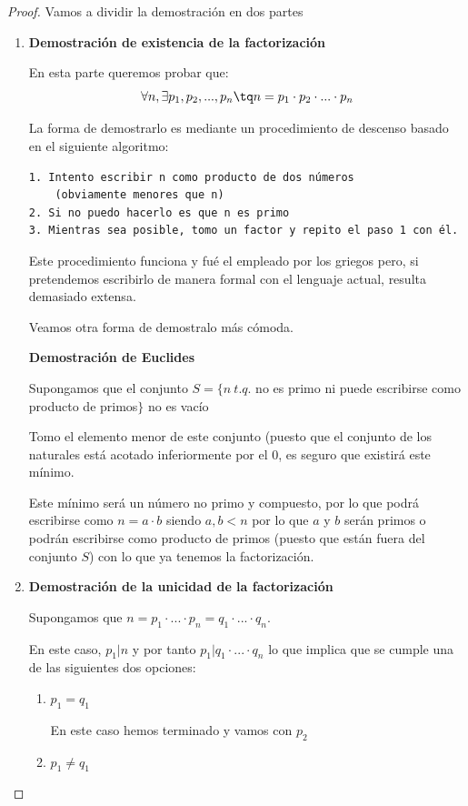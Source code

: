 \documentclass{apuntes}
\begin{document}
\begin{proof}
Vamos a dividir la demostración en dos partes

\begin{enumerate}
\item \textbf{Demostración de existencia de la factorización}

En esta parte queremos probar que:
\[\forall n , \exists p_1,p_2,...,p_n \tq n=p_1\cdot p_2 \cdot ... \cdot p_n\]

La forma de demostrarlo es mediante un procedimiento de descenso basado en el siguiente algoritmo:
\begin{verbatim}
1. Intento escribir n como producto de dos números
    (obviamente menores que n)
2. Si no puedo hacerlo es que n es primo
3. Mientras sea posible, tomo un factor y repito el paso 1 con él.
\end{verbatim}

Este procedimiento funciona y fué el empleado por los griegos pero, si pretendemos escribirlo de manera formal con el lenguaje actual, resulta demasiado extensa.

Veamos otra forma de demostralo más cómoda.

\textbf{Demostración de Euclides}

Supongamos que el conjunto $S=\{n \ t.q.$ no es primo ni puede escribirse como producto de primos$\}$ no es vacío

Tomo el elemento menor de este conjunto (puesto que el conjunto de los naturales está acotado inferiormente por el 0, es seguro que existirá este mínimo.

Este mínimo será un número no primo y compuesto, por lo que podrá escribirse como $n=a\cdot b $ siendo $a,b < n$ por lo que $a$ y $b$ serán primos o podrán escribirse como producto de primos (puesto que están fuera del conjunto $S$) con lo que ya tenemos la factorización.

\item \textbf{Demostración de la unicidad de la factorización}

Supongamos que $n=p_1\cdot...\cdot p_n=q_1\cdot ... \cdot q_n$.

En este caso, $p_1|n$ y por tanto $p_1|q_1\cdot ... \cdot q_n$ lo que implica que se cumple una de las siguientes dos opciones:
\begin{enumerate}
\item $p_1=q_1$

En este caso hemos terminado y vamos con $p_2$

\item $p_1\neq q_1$


\end{enumerate}
\end{enumerate}
\end{proof}
\end{document}
